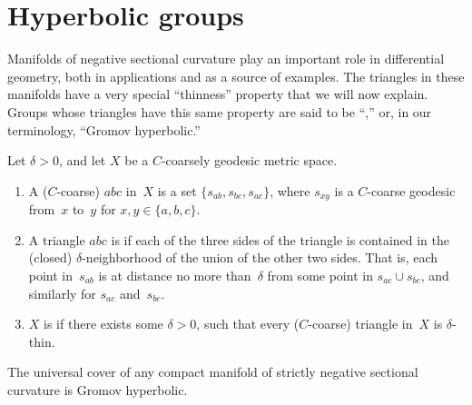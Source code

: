 \section{Hyperbolic groups} \label{GromovHyperGrpsSect}

Manifolds of negative sectional curvature play an important role in differential geometry, both in applications and as a source of examples. 
The triangles in these manifolds have a very special ``thinness'' property that we will now explain. Groups whose triangles have this same property are said to be ``\zz,'' or, in our terminology, ``Gromov hyperbolic\zz.''

\begin{defn}[(Gromov)] \label{GromovHyperDefn}
Let $\delta > 0$, and let $X$ be a $C$-coarsely geodesic metric space.
\noprelistbreak
	\begin{enumerate}
	\item A ($C$-coarse)  $abc$ in~$X$ is a set $\{s_{ab} , s_{bc} , s_{ac}\}$, where $s_{xy}$ is a $C$-coarse geodesic from~$x$ to~$y$ for $x,y \in \{a,b,c\}$.
	\item A triangle $abc$ is 
	if each of the three sides of the triangle is contained in the (closed) $\delta$-neighborhood of the union of the other two sides. That is, each point in~$s_{ab}$ is at distance no more than~$\delta$ from some point in $s_{ac} \cup s_{bc}$, and similarly for $s_{ac}$ and~$s_{bc}$.
	\item $X$ is  if there exists some $\delta > 0$, such that every ($C$-coarse) triangle in~$X$ is $\delta$-thin. 
	\end{enumerate}
\end{defn}

\begin{thm} \label{NegCurvGromovHyp}
The universal cover of any compact manifold of strictly negative sectional curvature is Gromov hyperbolic.
\end{thm}

